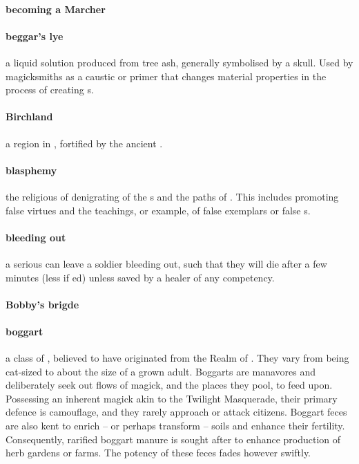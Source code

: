 \paragraph{becoming a Marcher} 
\paragraph{beggar's lye} a liquid solution produced from tree ash, generally symbolised by a skull. Used by magicksmiths as a caustic or primer that changes material properties in the process of creating s.
\paragraph{Birchland} a region in , fortified by the ancient .
\paragraph{blasphemy} the religious  of denigrating of the s and the paths of . This includes promoting false virtues and the teachings, or example, of false exemplars or false s.
\paragraph{bleeding out} a serious  can leave a soldier bleeding out, such that they will die after a few minutes (less if ed) unless saved by a healer of any competency.
\paragraph{Bobby's brigde} 
\paragraph{boggart} a class of , believed to have originated from the Realm of . They vary from being cat-sized to about the size of a grown adult. Boggarts are manavores and deliberately seek out flows of magick, and the places they pool, to feed upon. Possessing an inherent magick akin to the  Twilight Masquerade, their primary defence is camouflage, and they rarely approach or attack citizens. Boggart feces are also kent to enrich – or perhaps transform – soils and enhance their fertility. Consequently, rarified boggart manure is sought after to enhance production of herb gardens or farms. The potency of these feces fades however swiftly. 
